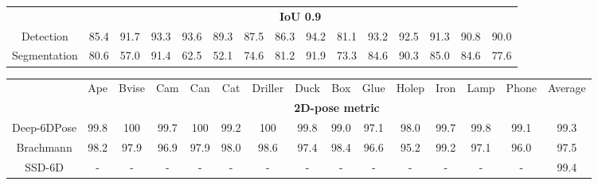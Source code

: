 \documentclass[conference]{IEEEtran}
\newcommand{\method}[1]{Deep-6DPose}
\begin{document}
\begin{table*}[!t]
\begin{center}
\begin{tabular}{c| c c c c c c c c c c c c c c}
	&\multicolumn{14}{c}{\textbf{IoU 0.9}} \\
Detection 	 &85.4 &91.7 &93.3 &93.6 &89.3 &87.5 &86.3 &94.2 &81.1 &93.2 &92.5 &91.3 &90.8 &90.0\\ 
Segmentation &80.6 &57.0 &91.4 &62.5 &52.1 &74.6 &81.2 &91.9 &73.3 &84.6 &90.3 &85.0 &84.6 &77.6\\ \hline
    \end{tabular}
    \end{center}
    \vspace{-0.2cm}
    \caption{F1 score for 2D detection and segmentation of \method{} on LINEMOD dataset~\cite{ACCV12} for single object.} 
    \label{tab:2D_det_seg}
\end{table*}\begin{table*}[!t]
   \centering
   \footnotesize
   \begin{center}
    \begin{tabular}{c| c c c c c c c c c c c c c c} 
&Ape &Bvise &Cam &Can &Cat &Driller &Duck &Box &Glue &Holep &Iron &Lamp &Phone &Average\\  
\Xhline{1pt}
	&\multicolumn{14}{c}{\textbf{2D-pose metric}}\\ 
\method{} &99.8 &100 &99.7 &100 &99.2 &100 &99.8 &99.0 &97.1 &98.0 &99.7 &99.8 &99.1 &99.3\\ 
Brachmann\cite{CVPR16} &98.2 &97.9 &96.9 &97.9 &98.0 &98.6 &97.4 &98.4 &96.6 &95.2 &99.2 &97.1 &96.0 &97.5\\
SSD-6D\cite{SSD-6D} &- &- &- &- &- &- &- &- &- &- &- &- &- &99.4\\


\end{tabular}
\end{center}
\end{table*}
\end{document}
